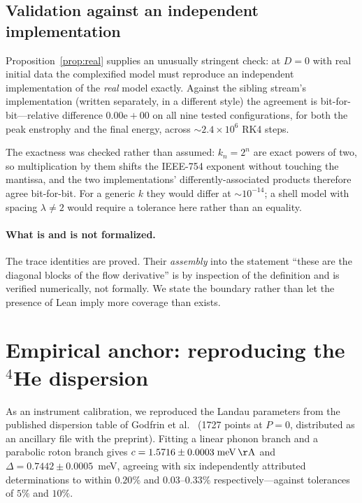 \documentclass[11pt,a4paper]{article}
\theoremstyle{definition}
\theoremstyle{remark}
\begin{document}
\subsection{Validation against an independent implementation}
\label{sec:posctl}

Proposition~\ref{prop:real} supplies an unusually stringent check: at $D=0$ with real
initial data the complexified model must reproduce an independent implementation of the
\emph{real} model exactly. Against the sibling stream's implementation (written separately,
in a different style) the agreement is bit-for-bit---relative difference $0.00\mathrm{e}{+}00$
on all nine tested configurations, for both the peak enstrophy and the final energy, across
$\sim\!2.4\times10^6$ RK4 steps.

The exactness was checked rather than assumed: $k_n=2^n$ are exact powers of two, so
multiplication by them shifts the IEEE-754 exponent without touching the mantissa, and the
two implementations' differently-associated products therefore agree bit-for-bit. For a
generic $k$ they would differ at $\sim10^{-14}$; a shell model with spacing $\lambda\neq2$
would require a tolerance here rather than an equality.

\paragraph{What is and is not formalized.} The trace identities are proved. Their
\emph{assembly} into the statement ``these are the diagonal blocks of the flow
derivative'' is by inspection of the definition and is verified numerically, not formally.
We state the boundary rather than let the presence of Lean imply more coverage than exists.

\section{Empirical anchor: reproducing the $^4$He dispersion}
\label{sec:m1}

As an instrument calibration, we reproduced the Landau parameters from the published
dispersion table of Godfrin et al.~\cite{Godfrin2021} (1727 points at $P=0$, distributed
as an ancillary file with the preprint). Fitting a linear phonon branch and a parabolic
roton branch gives $c = 1.5716\pm0.0003\;\mathrm{meV\,\AA}$ and
$\Delta = 0.7442\pm0.0005$~meV, agreeing with six independently attributed determinations
to within $0.20\%$ and $0.03$--$0.33\%$ respectively---against tolerances of $5\%$ and
$10\%$.
\end{document}
